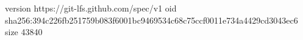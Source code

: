 version https://git-lfs.github.com/spec/v1
oid sha256:394c226fb251759b083f6001bc9469534c68c75ccf0011e734a4429cd3043ec6
size 43840
